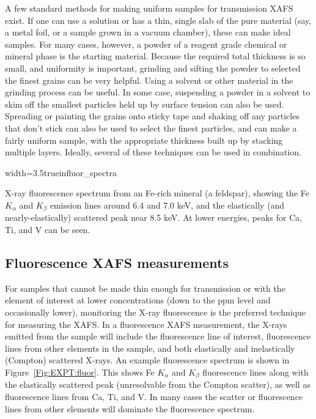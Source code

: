 A few standard methods for making uniform samples for transmission XAFS
exist.  If one can use a solution or has a thin, single slab of the pure
material (say, a metal foil, or a sample grown in a vacuum chamber), these
can make ideal samples.  For many cases, however, a powder of a reagent
grade chemical or mineral phase is the starting material.  Because the
required total thickness is so small, and uniformity is important, grinding
and sifting the powder to selected the finest grains can be very helpful.
Using a solvent or other material in the grinding process can be useful.  In
some case, suspending a powder in a solvent to skim off the smallest
particles held up by surface tension can also be used.  Spreading or
painting the grains onto sticky tape and shaking off any particles that
don't stick can also be used to select the finest particles, and can make a
fairly uniform sample, with the appropriate thickness built up by stacking
multiple layers.  Ideally, several of these techniques can be used in
combination.

\begin{Nfig}{width=3.5truein}{fluor_spectra}
  \caption{X-ray fluorescence spectrum from an Fe-rich mineral (a
    feldspar), showing the Fe $K_{\alpha }$ and $K_{\beta }$ emission lines
    around 6.4 and 7.0 keV, and the elastically (and nearly-elastically)
    scattered peak near 8.5 keV. At lower energies, peaks for Ca, Ti, and V
    can be seen.}
  \label{Fig:EXPT:fluor}
\end{Nfig}

\subsection{Fluorescence XAFS measurements}

For samples that cannot be made thin enough for transmission or with the
element of interest at lower concentrations (down to the ppm level and
occasionally lower), monitoring the X-ray fluorescence is the preferred
technique for measuring the XAFS.  In a fluorescence XAFS measurement, the
X-rays emitted from the sample will include the fluorescence line of
interest, fluorescence lines from other elements in the sample, and both
elastically and inelastically (Compton) scattered X-rays.  An example
fluorescence spectrum is shown in Figure~\ref{Fig:EXPT:fluor}.  This shows Fe
$K_{\alpha}$ and $K_{\beta}$ fluorescence lines along with the elastically
scattered peak (unresolvable from the Compton scatter), as well as
fluorescence lines from Ca, Ti, and V.  In many cases the scatter or
fluorescence lines from other elements will dominate the fluorescence
spectrum.

